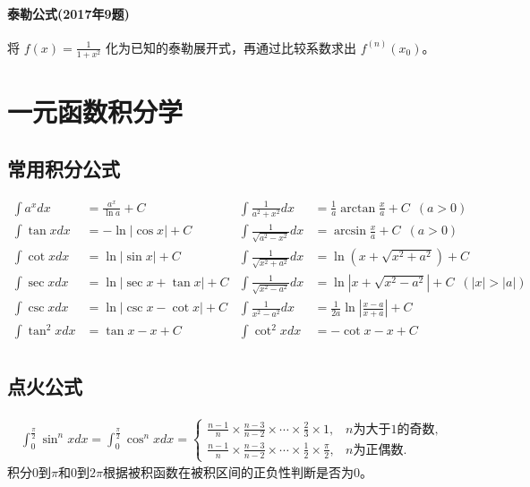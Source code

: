 ﻿\documentclass[a4paper,12pt,UTF8]{ctexart}
\begin{document}
    \paragraph{泰勒公式(2017年9题)}
    将 \(f(x)=\frac{1}{1+x^2}\) 化为已知的泰勒展开式，再通过比较系数求出 \(f^{(n)}(x_0)\)。

    \section{一元函数积分学}

    \subsection{常用积分公式}
    \begin{align*}
        \int {a}^{x} dx& = \frac{{a}^{x}}{\ln a}+C& \int \frac{1}{a^{2}+x^{2}}dx& = \frac{1}{a}\arctan\frac{x}{a}+C \enspace (a>0)&\\
        \int \tan x dx& = -\ln \left|\cos x \right|+C& \int \frac{1}{\sqrt{a^{2}-x^{2}}}dx& = \arcsin\frac{x}{a}+C \enspace (a>0)&\\
        \int \cot x dx& = \ln \left|\sin x \right|+C& \int \frac{1}{\sqrt{x^{2}+a^{2}}}dx& = \ln\left(x+\sqrt{x^{2}+a^{2}}\right)+C&\\
        \int \sec x dx& = \ln \left|\sec x + \tan x \right|+C& \int \frac{1}{\sqrt{x^{2}-a^{2}}}dx& = \ln\left|x+\sqrt{x^{2}-a^{2}}\right|+C \enspace (\left|x\right|>\left|a\right|)&\\
        \int \csc x dx& = \ln \left|\csc x - \cot x \right|+C& \int \frac{1}{x^{2}-a^{2}}dx& = \frac{1}{2a}\ln\left|\frac{x-a}{x+a}\right|+C&\\
        \int \tan^2 x dx& = \tan x-x+C& \int \cot^2 x dx& = -\cot x-x+C& \\
    \end{align*}
    
    \subsection{点火公式}
    \begin{align*}
        \int_{0}^{\frac{\pi}{2}} \sin^{n}x dx = \int_{0}^{\frac{\pi}{2}} \cos^{n}x dx =
        \begin{cases}
            \frac{n-1}{n} \times \frac{n-3}{n-2} \times \cdots \times \frac{2}{3} \times 1,& n \text{为大于} 1 \text{的奇数},\\
            \frac{n-1}{n} \times \frac{n-3}{n-2} \times \cdots \times \frac{1}{2} \times \frac{\pi}{2},& n \text{为正偶数}.
        \end{cases}
    \end{align*}
    积分0到\(\pi\)和0到\(2\pi\)根据被积函数在被积区间的正负性判断是否为0。
\end{document}
